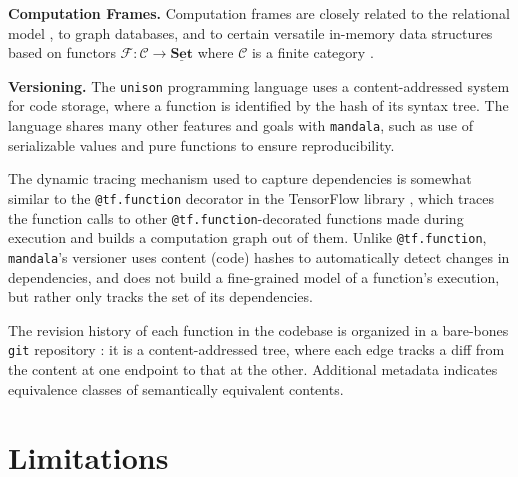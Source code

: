 \textbf{Computation Frames.} Computation frames are closely related to the
relational model \citep{codd1970relational}, to graph databases, and to certain
versatile in-memory data structures based on functors
$\mathcal{F}:\mathscr{C}\to \underline{\mathbf{Set}}$ where $\mathscr{C}$ is a
finite category \citep{patterson2022categorical}.

\textbf{Versioning.} The \texttt{unison} programming language
\citep{lozano2017unison} uses a content-addressed system for code storage, where
a function is identified by the hash of its syntax tree. The language shares
many other features and goals with \texttt{mandala}, such as use of serializable
values and pure functions to ensure reproducibility.

The dynamic tracing mechanism used to capture dependencies
is somewhat similar to the \texttt{@tf.function} decorator in the TensorFlow
library \citep{abadi2016tensorflow}, which traces the function calls to other
\texttt{@tf.function}-decorated functions made during execution and builds a
computation graph out of them. Unlike \texttt{@tf.function}, \texttt{mandala}'s
versioner uses content (code) hashes to automatically detect changes in
dependencies, and does not build a fine-grained model of a function's execution, but rather only tracks the set of its dependencies.

The revision history of each function in the codebase is
organized in a bare-bones \texttt{git} repository \citep{git}: it is a
content-addressed tree, where each edge tracks a diff from the content at one
endpoint to that at the other. Additional metadata indicates equivalence classes
of semantically equivalent contents.

\section{Limitations}
\label{sec:limitations}

